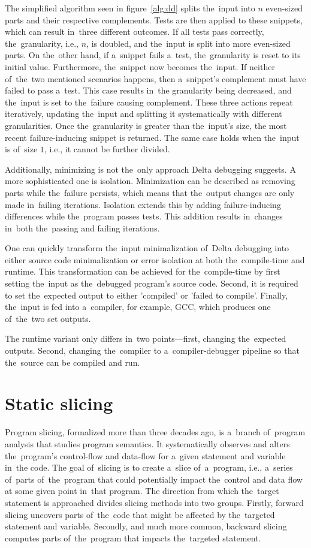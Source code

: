The simplified algorithm seen in figure~\ref{alg:dd} splits the~input into 
$n$ even-sized parts and their respective complements. 
Tests are then applied to these snippets, which can result in~three different outcomes. 
If all tests pass correctly, the~granularity, i.e., $n$, is doubled, and the~input is split
into more even-sized parts. 
On the~other hand, if a~snippet fails a~test, the~granularity is reset to its initial value.
Furthermore, the~snippet now becomes the~input. 
If neither of~the~two mentioned scenarios happens, 
then a~snippet's complement must have failed to pass a~test. 
This case results in~the granularity being decreased, 
and the~input is set to the~failure causing complement.
These three actions repeat iteratively, updating the~input and 
splitting it systematically with different granularities. 
Once the~granularity is greater than the~input's size, 
the most recent failure-inducing snippet is returned. 
The same case holds when the~input is of~size $1$, i.e., it cannot be further divided.

Additionally, minimizing is not the~only approach Delta debugging suggests.
A more sophisticated one is isolation. Minimization can be described as removing parts
while the~failure persists, which means that the~output changes are only made in~failing
iterations.
Isolation extends this by adding failure-inducing differences while the~program passes tests.
This addition results in~changes in~both the~passing and failing iterations.

One can quickly transform the~input minimalization of~Delta debugging into either source
code minimalization or error isolation at both the~compile-time and runtime.
This transformation can be achieved for the~compile-time by first setting the~input
as the~debugged program's source code. 
Second, it is required to set the~expected
output to either 'compiled' or 'failed to compile'. 
Finally, the~input is fed into a~compiler, for example, GCC, which produces
one of~the~two set outputs. 

The runtime variant only differs in~two points—first, changing the~expected outputs. 
Second, changing the~compiler to a~compiler-debugger pipeline so that the~source 
can be compiled and run.

\section{Static slicing}

Program slicing, formalized more than three decades ago,
is a~branch of~program analysis that studies program semantics.
It systematically observes and alters the~program's control-flow
and data-flow for a~given statement and variable in~the code.  
The goal of~slicing is to create a~slice of~a~program,
i.e., a~series of~parts of~the~program that could potentially
impact the~control and data flow at some given point in~that program. 
The direction from which the~target statement is approached divides 
slicing methods into two groups. 
Firstly, forward slicing uncovers parts of~the~code that 
might be affected by the~targeted statement and variable. 
Secondly, and much more common, backward slicing computes 
parts of~the~program that impacts the~targeted statement.

